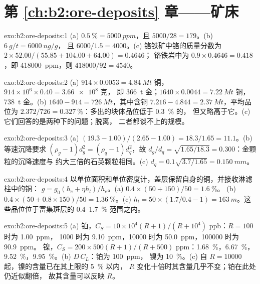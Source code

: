 \section*{第 \ref{ch:b2:ore-deposits} 章——矿床}

\begin{solution}{exo:b2:ore-deposits:1}
(a) $\qty{0.5}{\percent} = \qty{5000}{ppm}$，且 $5000/28 = 179$。(b) $\qty{6}{g/t} = \qty{6000}{ng/g}$，
且 $6000/1.5 = 4000$。(c) 铬铁矿中铬的质量分数为 $2 \times 52.00/(55.85 + 104.00 + 64.00) = 0.4646$；
铬铁岩中为 $0.9 \times 0.4646 = 0.418$，即 \qty{418000}{ppm}，则
$418000/92 = 4540$。
\end{solution}

\begin{solution}{exo:b2:ore-deposits:2}
(a) $914 \times 0.0053 = \qty{4.84}{Mt}$ 铜，$914 \times 10^6 \times 0.40 = \num{3.66e8}$ 克，
即 \qty{366}{t} 金；$1640 \times 0.0044 = \qty{7.22}{Mt}$ 铜，\qty{738}{t} 金。(b) $1640 - 914 =
\qty{726}{Mt}$，其中含铜 $7.216 - 4.844 = \qty{2.37}{Mt}$，平均品位为
$2.372/726 = \qty{0.327}{\percent}$：多出的块体品位低于 \qty{0.3}{\percent} 的，
但又略高于它。(c) 它们回答的是两种下的问题；脱离，
二者都谈不上的规模。
\end{solution}

\begin{solution}{exo:b2:ore-deposits:3}
(a) $(19.3 - 1.00)/(2.65 - 1.00) = 18.3/1.65 = 11.1$。(b) 等速沉降要求 $(\rho_g - 1)d_g^2 =
(\rho_q - 1)d_q^2$，故 $d_g/d_q = \sqrt{1.65/18.3} = 0.300$：金颗粒的沉降速度与
约大三倍的石英颗粒相同。(c) $d_q = 0.1\sqrt{3.7/1.65} = \qty{0.150}{mm}$。
\end{solution}

\begin{solution}{exo:b2:ore-deposits:4}
以单位面积和单位密度计，盖层保留自身的铜，并接收淋滤柱中的铜：
$g = g_0(h_e + \eta h_l)/h_e$。(a) $0.4 \times (50 + 150)/50 = \qty{1.6}{\percent}$。
(b) $0.4 \times (50 + 0.8 \times 150)/50 = \qty{1.36}{\percent}$。(c) $h_l = 50 \times (1.7/0.4 - 1)
= \qty{163}{m}$。这些品位位于富集斑层的
0.4--\qty{1.7}{\percent} 范围之内。
\end{solution}

\begin{solution}{exo:b2:ore-deposits:5}
(a) 铂，$C_S = 10 \times 10^4 (R + 1)/(R + 10^4)$ ppb：$R = 100$ 时为 \qty{1.00}{ppm}，
\num{1000} 时为 \qty{9.10}{ppm}，\num{10000} 时为 \qty{50.0}{ppm}，\num{100000} 时为 \qty{90.9}{ppm}。
镍，$C_S = 200 \times 500 (R + 1)/(R + 500)$ ppm：\qty{1.68}{\percent}，\qty{6.67}{\percent}，
\qty{9.52}{\percent}，\qty{9.95}{\percent}。(b) $D\,C_L$：铂为 \qty{100}{ppm}，
镍为 \qty{10}{\percent}。(c) 自 $R = \num{10000}$ 起，镍的含量已在其上限的 \qty{5}{\percent} 以内，
$R$ 变化十倍时其含量几乎不变；铂在此处仍近似翻倍，
故其含量可以反映 $R$。
\end{solution}

